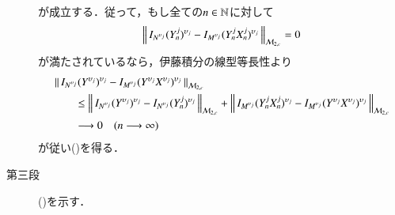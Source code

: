 \begin{prf}
\begin{description}
				が成立する．従って，もし全ての$n \in \mathbb{N}$に対して
				\begin{align}
					\left\|\, I_{N^{\upsilon_j}} (Y_n^j)^{\upsilon_j} - I_{M^{\upsilon_j}} (Y^j_n X^j_n)^{\upsilon_j}\, \right\|_{\mathcal{M}_{2,c}}
					= 0
					\label{eq:Ito-Integral_on_M_c_loc_report_7_3}
				\end{align}
				が満たされているなら，伊藤積分の線型等長性より
				\begin{align}
					&\left\|\, I_{N^{\upsilon_j}} (Y^{\upsilon_j})^{\upsilon_j} - I_{M^{\upsilon_j}} (Y^{\upsilon_j}X^{\upsilon_j})^{\upsilon_j}\, \right\|_{\mathcal{M}_{2,c}} \\
					&\qquad \leq \left\|\, I_{N^{\upsilon_j}} (Y^{\upsilon_j})^{\upsilon_j} - I_{N^{\upsilon_j}} (Y^j_n)^{\upsilon_j}\, \right\|_{\mathcal{M}_{2,c}}
						+ \left\|\, I_{M^{\upsilon_j}} (Y_n^j X_n^j)^{\upsilon_j} - I_{M^{\upsilon_j}} (Y^{\upsilon_j}X^{\upsilon_j})^{\upsilon_j}\, \right\|_{\mathcal{M}_{2,c}} \\
					&\qquad \longrightarrow 0 \quad (n \longrightarrow \infty)
				\end{align}
				が従い()を得る．
			
			\item[第三段]
				()を示す．
				\QED
		\end{description}
	\end{prf}